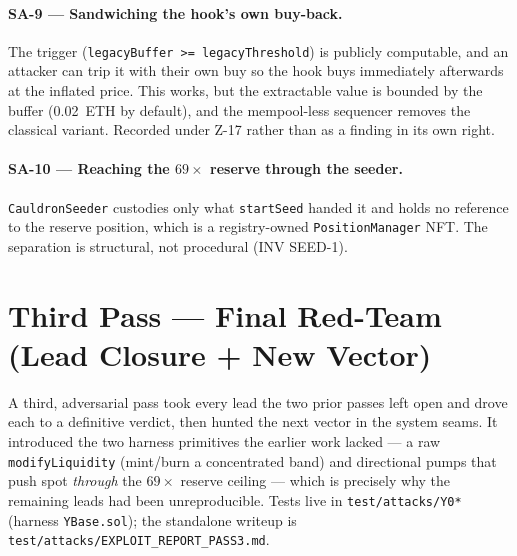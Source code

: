 \documentclass[10pt,a4paper]{article}
\newcommand{\code}[1]{\texttt{\small #1}}
\begin{document}
\paragraph{SA-9 --- Sandwiching the hook's own buy-back.} The trigger
(\code{legacyBuffer >= legacyThreshold}) is publicly computable, and an attacker can trip it
with their own buy so the hook buys immediately afterwards at the inflated price. This
works, but the extractable value is bounded by the buffer (0.02~ETH by default), and the
mempool-less sequencer removes the classical variant. Recorded under Z-17 rather than as a
finding in its own right.

\paragraph{SA-10 --- Reaching the $69\times$ reserve through the seeder.}
\code{CauldronSeeder} custodies only what \code{startSeed} handed it and holds no reference
to the reserve position, which is a registry-owned \code{PositionManager} NFT. The
separation is structural, not procedural (INV SEED-1).

\section{Third Pass --- Final Red-Team (Lead Closure + New Vector)}\label{sec:pass3}

A third, adversarial pass took every lead the two prior passes left open and drove
each to a definitive verdict, then hunted the next vector in the system seams. It
introduced the two harness primitives the earlier work lacked --- a raw
\code{modifyLiquidity} (mint/burn a concentrated band) and directional pumps that
push spot \emph{through} the $69\times$ reserve ceiling --- which is precisely why
the remaining leads had been unreproducible. Tests live in
\code{test/attacks/Y0*} (harness \code{YBase.sol}); the standalone writeup is
\code{test/attacks/EXPLOIT\_REPORT\_PASS3.md}.
\end{document}
